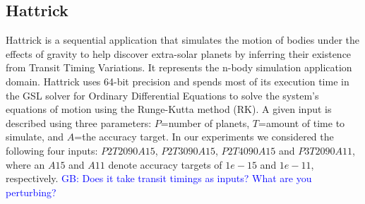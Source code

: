 \documentclass[10pt, conference, compsocconf]{IEEEtran}
\newcommand{\sui}[1]{%
  \textcolor{green}{SC-#1}
}
\newcommand{\greg}[1]{%
  \textcolor{blue}{GB: #1}
}
\begin{document}
\vspace{-10pt}
\subsection{Hattrick}
\vspace{-10pt}
\label{sec:apps:hattrick}
Hattrick is a sequential application that simulates the motion of bodies under the effects of gravity to help discover extra-solar planets by inferring their existence from Transit Timing Variations.
It represents the n-body simulation application domain.
Hattrick uses 64-bit precision and spends most of its execution time in the GSL solver for Ordinary Differential Equations to solve the system's equations of motion using the Runge-Kutta method (RK).
A given input is described using three parameters: $P$=number of planets, $T$=amount of time to simulate, and $A$=the accuracy target.
In our experiments we considered the following four inputs: $P2T2090A15$, $P2T3090A15$, $P2T4090A15$ and $P3T2090A11$, where an $A15$ and $A11$ denote accuracy targets of $1e-15$ and $1e-11$, respectively.
\greg{Does it take transit timings as inputs? What are you perturbing?}


\vspace{-10pt}
\end{document}
